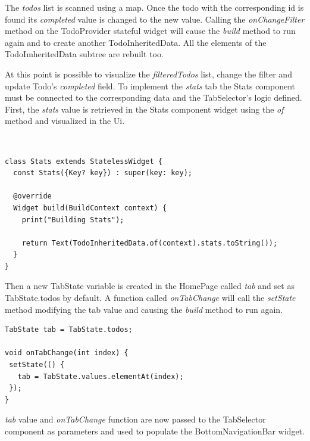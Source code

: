 The \textit{todos }list is scanned using a map. Once the todo with the corresponding id is found its \textit{completed }value is changed to the new value. Calling the \textit{onChangeFilter }method on the TodoProvider stateful widget will cause the \textit{build}  method to run again and to create another TodoInheritedData. All the elements of the TodoImheritedData subtree are rebuilt too.

At this point is possible to visualize the \textit{filteredTodos} list, change the filter and update Todo’s \textit{completed }field. To implement the \textit{stats} tab the Stats component must be connected to the corresponding data and  the TabSelector’s logic defined. First, the \textit{stats} value is retrieved in the Stats component widget using the \textit{of} method and visualized in the Ui.

\mbox{}\\


\begin{verbatim}
class Stats extends StatelessWidget {
  const Stats({Key? key}) : super(key: key);

  @override
  Widget build(BuildContext context) {
    print("Building Stats");

    return Text(TodoInheritedData.of(context).stats.toString());
  }
}
\end{verbatim}

Then a new TabState variable is created in the HomePage called \textit{tab} and set as TabState.todos by default. A function called \textit{onTabChange} will call the \textit{setState} method modifying the tab value and causing the \textit{build} method to run again. 
\mbox{}\\


\begin{verbatim}
TabState tab = TabState.todos;

void onTabChange(int index) {
 setState(() {
   tab = TabState.values.elementAt(index);
 });
}
\end{verbatim}

\textit{tab} value and \textit{onTabChange} function are now passed to the TabSelector component as parameters and used to populate the BottomNavigationBar widget.

\mbox{}\\


